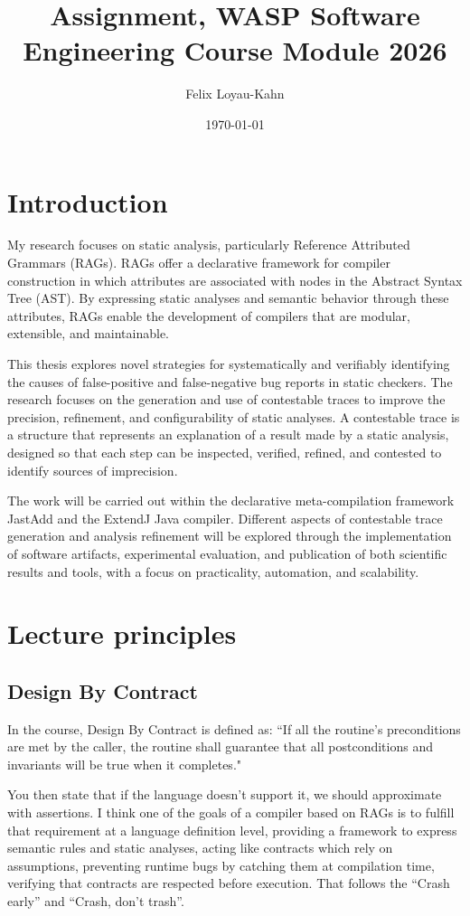 \documentclass[11pt]{article}
\author{Felix Loyau-Kahn}
\date{\today}
\title{Assignment, WASP Software Engineering Course Module 2026}
\begin{document}
\maketitle
\section{Introduction}
\label{sec:org6a43f5d}
My research focuses on static analysis, particularly Reference Attributed
Grammars (RAGs). RAGs offer a declarative framework for compiler construction in
which attributes are associated with nodes in the Abstract Syntax Tree (AST). By
expressing static analyses and semantic behavior through these attributes, RAGs
enable the development of compilers that are modular, extensible, and
maintainable.

This thesis explores novel strategies for systematically and verifiably
identifying the causes of false-positive and false-negative bug reports in
static checkers. The research focuses on the generation and use of contestable
traces to improve the precision, refinement, and configurability of static
analyses. A contestable trace is a structure that represents an explanation of a
result made by a static analysis, designed so that each step can be inspected,
verified, refined, and contested to identify sources of imprecision.

The work will be carried out within the declarative meta-compilation framework
JastAdd and the ExtendJ Java compiler. Different aspects of contestable trace
generation and analysis refinement will be explored through the implementation
of software artifacts, experimental evaluation, and publication of both
scientific results and tools, with a focus on practicality, automation, and
scalability.
\section{Lecture principles}
\label{sec:orge365ff2}
\subsection{Design By Contract}
\label{sec:org25cd4e6}
In the course, Design By Contract is defined as: “If all the routine’s
preconditions are met by the caller, the routine shall guarantee that all
postconditions and invariants will be true when it completes."

You then state that if the language doesn’t support it, we should approximate
with assertions. I think one of the goals of a compiler based on RAGs is to
fulfill that requirement at a language definition level, providing a framework
to express semantic rules and static analyses, acting like contracts which rely
on assumptions, preventing runtime bugs by catching them at compilation time,
verifying that contracts are respected before execution. That follows the “Crash
early” and “Crash, don’t trash”.
\end{document}
